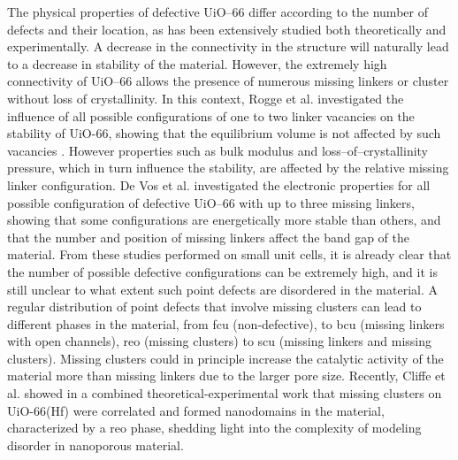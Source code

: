\npar
The physical properties of defective UiO--66 differ according to the number of defects and their location, as has been extensively studied both theoretically and experimentally. A decrease in the connectivity in the structure will naturally lead to a decrease in stability of the material. However, the extremely high connectivity of UiO--66 allows the presence of numerous missing linkers or cluster without loss of crystallinity. 
In this context, Rogge et al. investigated the influence of all possible configurations of one to two linker vacancies on the stability of UiO-66, showing that the equilibrium volume is not affected by such vacancies \cite{rogge2016thermodynamic}. However properties such as bulk modulus and loss--of--crystallinity pressure, which in turn influence the stability, are affected by the relative missing linker configuration. 
De Vos et al.\cite{devos2017missing} investigated the electronic properties for all possible configuration of defective UiO--66 with up to three missing linkers, showing that some configurations are energetically more stable than others, and that the number and position of missing linkers affect the band gap of the material. From these studies performed on small unit cells, it is already clear that the number of possible defective configurations can be extremely high, and it is still unclear to what extent such point defects are disordered in the material. A regular distribution of point defects that involve missing clusters can lead to different phases in the material, from fcu (non-defective), to bcu (missing linkers with open channels), reo (missing clusters) to scu (missing linkers and missing clusters). Missing clusters could in principle increase the catalytic activity of the material more than missing linkers due to the larger pore size. Recently, Cliffe et al. \cite{cliffe2014correlated} showed in a combined theoretical-experimental work that missing clusters on UiO-66(Hf) were correlated and formed nanodomains in the material, characterized by a reo phase, shedding light into the complexity of modeling disorder in nanoporous material. 

